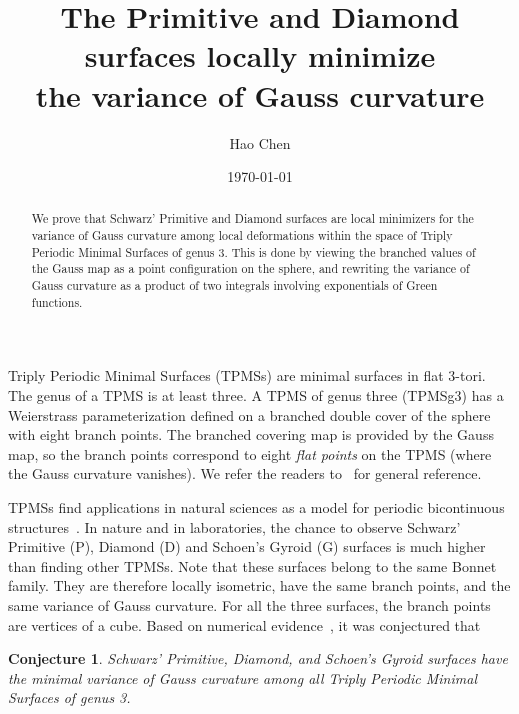 \documentclass[a4paper]{amsart}
\theoremstyle{plain} %
\newtheorem*{conjecture}{Conjecture}
\theoremstyle{definition} %
\theoremstyle{remark}
\begin{document}
\title[D and P locally minimize Gauss variance]{The Primitive and Diamond surfaces locally minimize\\ the variance of Gauss curvature}

\author{Hao Chen}
\address{ShanghaiTech University, Shanghai, China}


\date{\today}

\begin{abstract}
	We prove that Schwarz' Primitive and Diamond surfaces are local minimizers
	for the variance of Gauss curvature among local deformations within the space
	of Triply Periodic Minimal Surfaces of genus 3.  This is done by viewing the
	branched values of the Gauss map as a point configuration on the sphere, and
	rewriting the variance of Gauss curvature as a product of two integrals
	involving exponentials of Green functions.
\end{abstract}

\maketitle

Triply Periodic Minimal Surfaces (TPMSs) are minimal surfaces in flat 3-tori.
The genus of a TPMS is at least three.  A TPMS of genus three (TPMSg3) has a
Weierstrass parameterization defined on a branched double cover of the sphere
with eight branch points.  The branched covering map is provided by the Gauss
map, so the branch points correspond to eight \emph{flat points} on the TPMS
(where the Gauss curvature vanishes).  We refer the readers to~\cite{meeks1990}
for general reference.

TPMSs find applications in natural sciences as a model for periodic
bicontinuous structures~\cite{hyde1996}.  In nature and in laboratories, the
chance to observe Schwarz' Primitive (P), Diamond (D) and Schoen's Gyroid (G)
surfaces is much higher than finding other TPMSs.  Note that these surfaces
belong to the same Bonnet family.  They are therefore locally isometric, have
the same branch points, and the same variance of Gauss curvature.  For all the
three surfaces, the branch points are vertices of a cube.  Based on numerical
evidence~\cite{schroderturk2006}, it was conjectured that

\begin{conjecture}
	Schwarz' Primitive, Diamond, and Schoen's Gyroid surfaces have the minimal
	variance of Gauss curvature among all Triply Periodic Minimal Surfaces of
	genus 3.
\end{conjecture}
\end{document}
